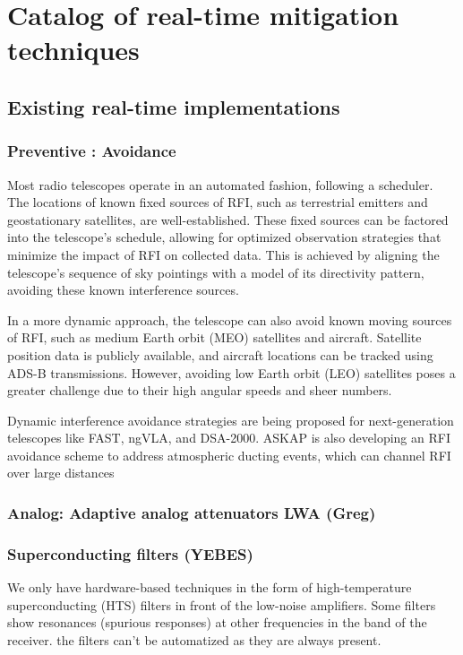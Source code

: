 \section{Catalog of real-time mitigation techniques}
\label{section:hardware:catalog}

\subsection{Existing real-time implementations}
\label{subsection:hardware:catalog:existing}
\subsubsection{Preventive : Avoidance}
Most radio telescopes operate in an automated fashion, following a scheduler. The locations of known fixed sources of RFI, such as terrestrial emitters and geostationary satellites, are well-established. These fixed sources can be factored into the telescope's schedule, allowing for optimized observation strategies that minimize the impact of RFI on collected data. This is achieved by aligning the telescope's sequence of sky pointings with a model of its directivity pattern, avoiding these known interference sources.

In a more dynamic approach, the telescope can also avoid known moving sources of RFI, such as medium Earth orbit (MEO) satellites and aircraft. Satellite position data is publicly available, and aircraft locations can be tracked using ADS-B transmissions. However, avoiding low Earth orbit (LEO) satellites poses a greater challenge due to their high angular speeds and sheer numbers.

Dynamic interference avoidance strategies are being proposed for next-generation telescopes like FAST, ngVLA, and DSA-2000. ASKAP is also developing an RFI avoidance scheme to address atmospheric ducting events, which can channel RFI over large distances

\subsubsection{Analog: Adaptive analog attenuators LWA (Greg)}

\subsubsection{Superconducting filters (YEBES)}
We only have hardware-based techniques in the form of high-temperature superconducting (HTS) filters in front of the low-noise amplifiers.
Some filters show resonances (spurious responses) at other frequencies in the band of the receiver.
the filters can’t be automatized as they are always present.


